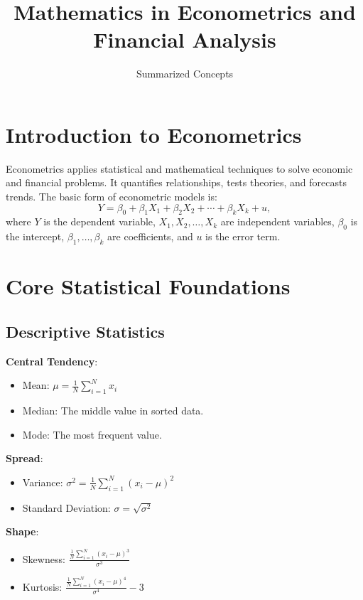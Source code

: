 \documentclass{article}
\title{Mathematics in Econometrics and Financial Analysis}
\author{Summarized Concepts}
\date{}
\begin{document}
\maketitle

\tableofcontents

\section{Introduction to Econometrics}
Econometrics applies statistical and mathematical techniques to solve economic and financial problems. It quantifies relationships, tests theories, and forecasts trends. The basic form of econometric models is:
\begin{equation}
    Y = \beta_0 + \beta_1X_1 + \beta_2X_2 + \cdots + \beta_kX_k + u,
\end{equation}
where $Y$ is the dependent variable, $X_1, X_2, \ldots, X_k$ are independent variables, $\beta_0$ is the intercept, $\beta_1, \ldots, \beta_k$ are coefficients, and $u$ is the error term.

\section{Core Statistical Foundations}
\subsection{Descriptive Statistics}
\textbf{Central Tendency}:
\begin{itemize}
    \item Mean: $\mu = \frac{1}{N} \sum_{i=1}^N x_i$
    \item Median: The middle value in sorted data.
    \item Mode: The most frequent value.
\end{itemize}
\textbf{Spread}:
\begin{itemize}
    \item Variance: $\sigma^2 = \frac{1}{N} \sum_{i=1}^N (x_i - \mu)^2$
    \item Standard Deviation: $\sigma = \sqrt{\sigma^2}$
\end{itemize}
\textbf{Shape}:
\begin{itemize}
    \item Skewness: $\frac{\frac{1}{N} \sum_{i=1}^N (x_i - \mu)^3}{\sigma^3}$
    \item Kurtosis: $\frac{\frac{1}{N} \sum_{i=1}^N (x_i - \mu)^4}{\sigma^4} - 3$
\end{itemize}
\end{document}
